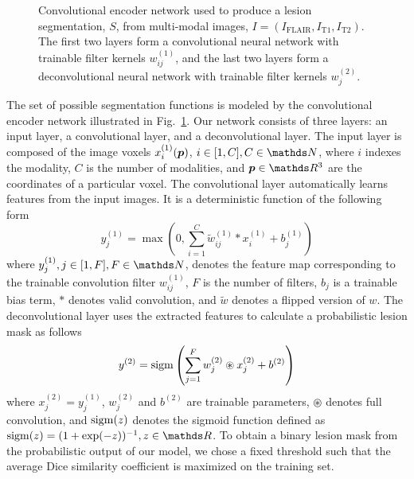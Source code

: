 \begin{figure}[tb]
\centering


\caption{Convolutional encoder network used to produce a lesion segmentation,
$S$, from multi-modal images, $I = (I_\text{FLAIR}, I_\text{T1}, I_\text{T2})$.
The first two layers form a convolutional neural network with trainable filter
kernels $w^{(1)}_{ij}$, and the last two layers form a deconvolutional neural
network with trainable filter kernels $w^{(2)}_j$.}

\label{fig:network}
\end{figure}

The set of possible segmentation functions is modeled by the convolutional
encoder network illustrated in Fig.~\ref{fig:network}. Our network consists of
three layers: an input layer, a convolutional layer, and a deconvolutional
layer. The input layer is composed of the image voxels $x^{(1)}_i(\vect{p})$, $i
\in [1, C], C \in \N$, where $i$ indexes the modality, $C$ is the number of
modalities, and $\vect{p} \in \R^3$ are the coordinates of a particular voxel.
The convolutional layer automatically learns features from the input images. It
is a deterministic function of the following form
\begin{equation}
y^{(1)}_j = \max \left(0, \sum_{i=1}^{C}\tilde{w}^{(1)}_{ij}*x^{(1)}_i +
b^{(1)}_j\right)
\end{equation}
where $y^{(1)}_j, j \in [1, F], F \in \N$, denotes the feature map corresponding
to the trainable convolution filter $w^{(1)}_{ij}$, $F$ is the number of
filters, $b_j$ is a trainable bias term, $*$ denotes valid convolution, and
$\tilde{w}$ denotes a flipped version of $w$. The deconvolutional layer uses the
extracted features to calculate a probabilistic lesion mask as follows
\begin{equation}
y^{(2)} = \operatorname{sigm}\left(\sum_{j=1}^Fw^{(2)}_{j}\circledast x^{(2)}_j +
b^{(2)}\right)
\end{equation}
where $x^{(2)}_j = y^{(1)}_j$, $w^{(2)}_j$ and $b^{(2)}$ are trainable
parameters, $\circledast$ denotes full convolution, and $\operatorname{sigm}(z)$ denotes the
sigmoid function defined as $\sigm(z) = (1 + \exp(-z))^{-1}, z \in \R$. To
obtain a binary lesion mask from the probabilistic output of our model, we chose
a fixed threshold such that the average Dice similarity coefficient is
maximized on the training set.


